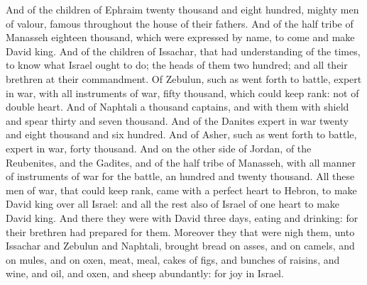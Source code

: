 {And of the
children of
Ephraim
twenty
thousand and
eight
hundred,
mighty
men of
valour,
famous throughout the
house of their
fathers.
And of the
half
tribe of
Manasseh
eighteen
thousand, which were
expressed by
name, to
come and make
David
king.
And of the
children of
Issachar,
{} that had
understanding of the
times, to
know what
Israel ought to
do; the
heads of them
{} two
hundred; and all their
brethren
{} at their
commandment.
Of
Zebulun, such as went
forth to
battle,
expert in
war, with all
instruments of
war,
fifty
thousand, which could keep
rank:
{} not of
double
heart.
And of
Naphtali a
thousand
captains, and with them with
shield and
spear
thirty and
seven
thousand.
And of the
Danites
expert in
war
twenty and
eight
thousand and
six
hundred.
And of
Asher, such as went
forth to
battle,
expert in
war,
forty
thousand.
And on the other
side of
Jordan, of the
Reubenites, and the
Gadites, and of the
half
tribe of
Manasseh, with all manner of
instruments of
war for the
battle, an
hundred and
twenty
thousand.
All these
men of
war, that could
keep
rank,
came with a
perfect
heart to
Hebron, to make
David
king over all
Israel: and all the
rest also of
Israel
{} of
one
heart to make
David
king.
And there they were with
David
three
days,
eating and
drinking: for their
brethren had
prepared for them.
Moreover they that were
nigh them,
{} unto
Issachar and
Zebulun and
Naphtali,
brought
bread on
asses, and on
camels, and on
mules, and on
oxen,
{}
meat,
meal,
cakes of figs, and bunches of
raisins, and
wine, and
oil, and
oxen, and
sheep
abundantly: for
{}
joy in
Israel.

}
